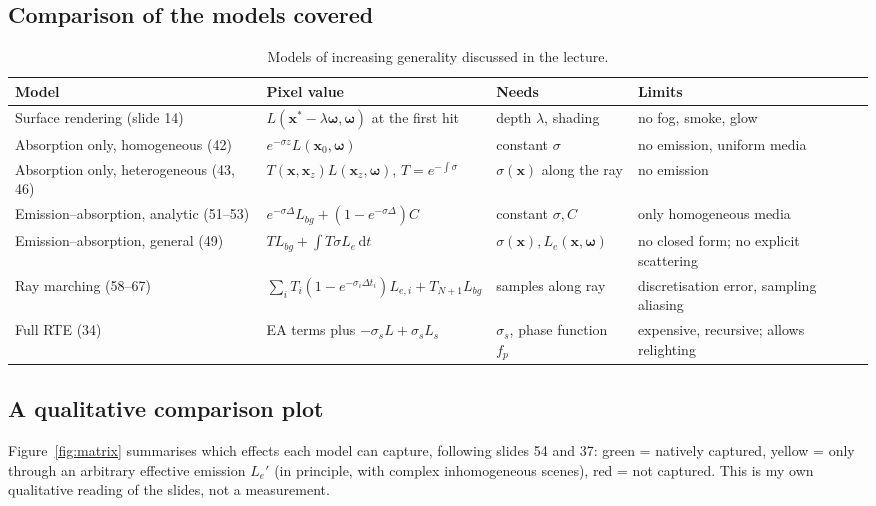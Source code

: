 \documentclass[11pt,a4paper]{article}
\newcommand{\x}{{\bm{x}}}
\newcommand{\w}{{\bm{\omega}}}
\theoremstyle{definition}
\theoremstyle{plain}
\theoremstyle{remark}
\begin{document}
\subsection{Comparison of the models covered}

\begin{table}[h]
\centering
\small
\renewcommand{\arraystretch}{1.35}
\begin{tabular}{@{}p{3.1cm}p{4.4cm}p{3.7cm}p{3.5cm}@{}}
\toprule
\textbf{Model} & \textbf{Pixel value} & \textbf{Needs} & \textbf{Limits}\\
\midrule
Surface rendering (slide 14) & $L(\x^*-\lambda\w,\w)$ at the first hit & depth $\lambda$, shading & no fog, smoke, glow\\
Absorption only, homogeneous (42) & $e^{-\sigma z}L(\x_0,\w)$ & constant $\sigma$ & no emission, uniform media\\
Absorption only, heterogeneous (43, 46) & $T(\x,\x_z)L(\x_z,\w)$, $T=e^{-\int\sigma}$ & $\sigma(\x)$ along the ray & no emission\\
Emission--absorption, analytic (51--53) & $e^{-\sigma\Delta}L_{bg}+(1-e^{-\sigma\Delta})C$ & constant $\sigma,C$ & only homogeneous media\\
Emission--absorption, general (49) & $T L_{bg}+\int T\sigma L_e\,\mathrm dt$ & $\sigma(\x),L_e(\x,\w)$ & no closed form; no explicit scattering\\
Ray marching (58--67) & $\sum_iT_i(1-e^{-\sigma_i\Delta t_i})L_{e,i}+T_{N+1}L_{bg}$ & samples along ray & discretisation error, sampling aliasing\\
Full RTE (34) & EA terms plus $-\sigma_sL+\sigma_sL_s$ & $\sigma_s$, phase function $f_p$ & expensive, recursive; allows relighting\\
\bottomrule
\end{tabular}
\caption{Models of increasing generality discussed in the lecture.}
\end{table}

\subsection{A qualitative comparison plot}

Figure~\ref{fig:matrix} summarises which effects each model can capture, following slides 54 and 37: green = natively captured, yellow = only through an arbitrary effective emission $L_e'$ (in principle, with complex inhomogeneous scenes), red = not captured. This is my own qualitative reading of the slides, not a measurement.
\end{document}
